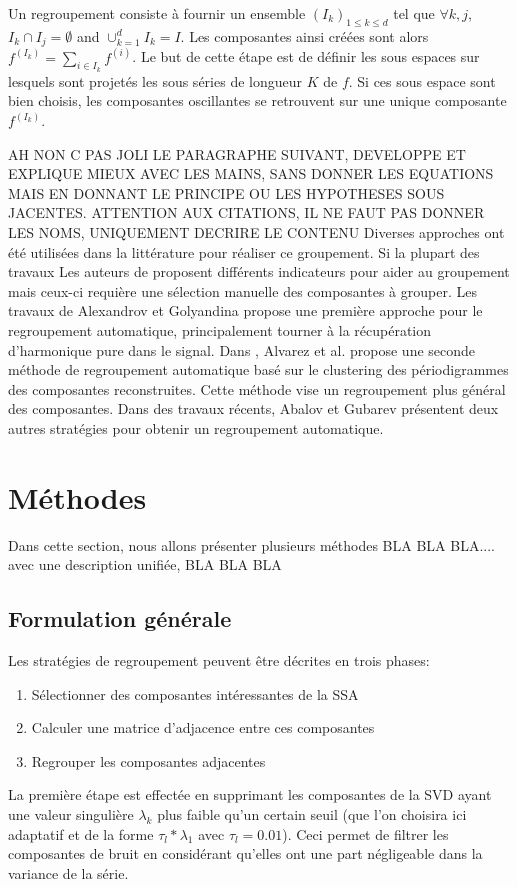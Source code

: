 \documentclass{gretsi}
\begin{document}
Un regroupement consiste à fournir un ensemble $(I_k)_{1 \le k \le d}$ tel que $\forall k, j$, $I_k \cap I_j = \emptyset$ and $\displaystyle \cup_{k=1}^d I_k = I$. Les composantes ainsi créées sont alors $f^{(I_k)} = \sum_{i \in I_k} f^{(i)}$. Le but de cette étape est de définir les sous espaces sur lesquels sont projetés les sous séries de longueur $K$ de $f$. Si ces sous espace sont bien choisis, les composantes oscillantes se retrouvent sur une unique composante $f^{(I_k)}$. 



AH NON C PAS JOLI LE PARAGRAPHE SUIVANT, DEVELOPPE ET EXPLIQUE MIEUX AVEC LES MAINS, SANS DONNER LES EQUATIONS MAIS EN DONNANT LE PRINCIPE OU LES HYPOTHESES SOUS JACENTES. ATTENTION AUX CITATIONS, IL NE FAUT PAS DONNER LES NOMS, UNIQUEMENT DECRIRE LE CONTENU
Diverses approches ont été utilisées dans la littérature pour réaliser ce groupement. Si la plupart des travaux Les auteurs de \cite{GNZ_10_SSA} proposent différents indicateurs pour aider au groupement mais ceux-ci requière une sélection manuelle des composantes à grouper.
Les travaux de Alexandrov et Golyandina \cite{alexandrov_05_auto} propose une première approche pour le regroupement automatique, principalement tourner à la récupération d'harmonique pure dans le signal. Dans \cite{alvarez_2013_auto}, Alvarez et al. propose une seconde méthode de regroupement automatique basé sur le clustering des périodigrammes des composantes reconstruites. Cette méthode vise un regroupement plus général des composantes. Dans des travaux récents, Abalov et Gubarev \cite{abalov_14_auto} présentent deux autres stratégies pour obtenir un regroupement automatique. 



\section{Méthodes}
Dans cette section, nous allons présenter plusieurs méthodes BLA BLA BLA.... avec une description unifiée, BLA BLA BLA


\subsection{Formulation générale}
\label{sub:form}

Les stratégies de regroupement peuvent être décrites en trois phases:
\begin{enumerate}
	\item Sélectionner des composantes intéressantes de la SSA
	\item Calculer une matrice d'adjacence entre ces composantes
	\item Regrouper les composantes adjacentes
\end{enumerate}
La première étape est effectée en supprimant les composantes de la SVD ayant une valeur singulière $\lambda_k$ plus faible qu'un certain seuil (que l'on choisira ici adaptatif et de la forme  $\tau_l*\lambda_1$ avec $\tau_l = 0.01$). Ceci permet de filtrer les composantes de bruit en considérant qu'elles ont une part négligeable dans la variance de la série. 
\end{document}

